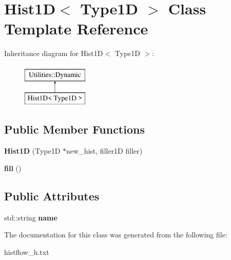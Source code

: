 \hypertarget{classHist1D}{}\section{Hist1D$<$ Type1D $>$ Class Template Reference}
\label{classHist1D}
Inheritance diagram for Hist1D$<$ Type1D $>$\+:\begin{figure}[H]
\begin{center}
\leavevmode
\includegraphics[height=2.000000cm]{classHist1D}
\end{center}
\end{figure}
\subsection*{Public Member Functions}
\begin{DoxyCompactItemize}
\item 
{\bfseries Hist1D} (Type1D $\ast$new\+\_\+hist, filler1D filler)\hypertarget{classHist1D_a7b4d34dee4e18b5220452d1a214bc2fe}{}\label{classHist1D_a7b4d34dee4e18b5220452d1a214bc2fe}

\item 
{\bfseries fill} ()\hypertarget{classHist1D_a5f64735f56c0b80c1b7ed661539b323b}{}\label{classHist1D_a5f64735f56c0b80c1b7ed661539b323b}

\end{DoxyCompactItemize}
\subsection*{Public Attributes}
\begin{DoxyCompactItemize}
\item 
std\+::string {\bfseries name}\hypertarget{classHist1D_a431cdac050f2a484a6e9ab93cfa501a0}{}\label{classHist1D_a431cdac050f2a484a6e9ab93cfa501a0}

\end{DoxyCompactItemize}


The documentation for this class was generated from the following file\+:\begin{DoxyCompactItemize}
\item 
histflow\+\_\+h.\+txt\end{DoxyCompactItemize}
